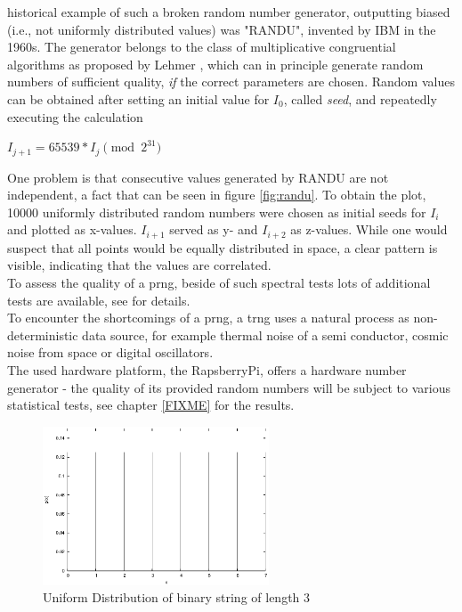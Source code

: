 historical example of such a broken random number generator, outputting biased (i.e., not uniformly distributed values) was "RANDU", invented by IBM in the
1960s. 
The generator belongs to the class of multiplicative congruential algorithms as proposed by Lehmer \cite{MR0044899}, which can in principle generate random
numbers of sufficient quality, \textit{if} the correct parameters are chosen.
Random values can be obtained after setting an initial value for $I_0$, called \textit{seed}, and repeatedly executing the calculation
\begin{center}
 $I_{j+1} = 65539 * I_j \pmod{2^{31}}$
\end{center}
One problem 
is that consecutive values generated by RANDU are not independent, a fact that	 can be seen in figure \ref{fig:randu}. To obtain the plot, 10000 uniformly distributed 
random numbers were chosen as initial seeds for $I_i$ and plotted as x-values. $I_{i+1}$ served as y- and $I_{i+2}$ as z-values. While one would suspect that all points
would be equally distributed in space, a clear pattern is visible, indicating that the values are correlated.
\\
To assess the quality of a \gls{prng}, beside of such spectral tests lots of additional tests are available, see \cite{nistRAND} for details.
\\
To encounter the shortcomings of a \gls{prng}, a \gls{trng} uses a natural process as non-deterministic data source, for example
thermal noise of a semi conductor, cosmic noise from space or digital oscillators.
\\
The used hardware platform, the RapsberryPi, offers a hardware number generator - the quality of its provided random numbers will be subject
to various statistical tests, see chapter \ref{FIXME} for the results.
\begin{figure}
    \centering
    \includegraphics[width=0.6\textwidth]{figures/uniform}
    \caption{Uniform Distribution of binary string of length 3}
    \label{fig:uniform}
\end{figure}

